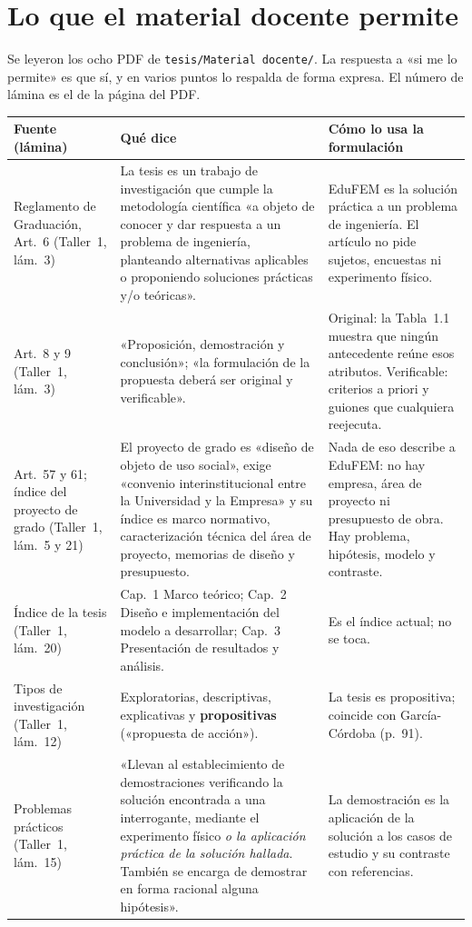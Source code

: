 \documentclass[11pt,a4paper]{article}
\begin{document}
\section{Lo que el material docente permite}
\label{sec:material}

Se leyeron los ocho PDF de \texttt{tesis/Material docente/}. La respuesta a «si me lo permite» es que sí, y en varios puntos lo respalda de forma expresa. El número de lámina es el de la página del PDF.

{\small
\begin{longtable}{L{3.6cm}L{6.4cm}L{5.7cm}}
\toprule
\textbf{Fuente (lámina)} & \textbf{Qué dice} & \textbf{Cómo lo usa la formulación} \\
\midrule
\endhead
Reglamento de Graduación, Art.~6 (Taller~1, lám.~3) & La tesis es un trabajo de investigación que cumple la metodología científica «a objeto de conocer y dar respuesta a un problema de ingeniería, planteando alternativas aplicables o proponiendo soluciones prácticas y/o teóricas». & EduFEM es la solución práctica a un problema de ingeniería. El artículo no pide sujetos, encuestas ni experimento físico. \\
Art.~8 y 9 (Taller~1, lám.~3) & «Proposición, demostración y conclusión»; «la formulación de la propuesta deberá ser original y verificable». & Original: la Tabla~1.1 muestra que ningún antecedente reúne esos atributos. Verificable: criterios a priori y guiones que cualquiera reejecuta. \\
Art.~57 y 61; índice del proyecto de grado (Taller~1, lám.~5 y 21) & El proyecto de grado es «diseño de objeto de uso social», exige «convenio interinstitucional entre la Universidad y la Empresa» y su índice es marco normativo, caracterización técnica del área de proyecto, memorias de diseño y presupuesto. & Nada de eso describe a EduFEM: no hay empresa, área de proyecto ni presupuesto de obra. Hay problema, hipótesis, modelo y contraste. \\
Índice de la tesis (Taller~1, lám.~20) & Cap.~1 Marco teórico; Cap.~2 Diseño e implementación del modelo a desarrollar; Cap.~3 Presentación de resultados y análisis. & Es el índice actual; no se toca. \\
Tipos de investigación (Taller~1, lám.~12) & Exploratorias, descriptivas, explicativas y \textbf{propositivas} («propuesta de acción»). & La tesis es propositiva; coincide con García-Córdoba (p.~91). \\
Problemas prácticos (Taller~1, lám.~15) & «Llevan al establecimiento de demostraciones verificando la solución encontrada a una interrogante, mediante el experimento físico \emph{o la aplicación práctica de la solución hallada}. También se encarga de demostrar en forma racional alguna hipótesis». & La demostración es la aplicación de la solución a los casos de estudio y su contraste con referencias. \\

\end{longtable}}
\end{document}
